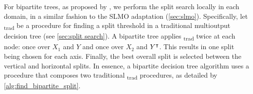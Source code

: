 For bipartite trees, as proposed by , we perform the split search locally in each domain, in a similar fashion to the SLMO adaptation (\autoref{sec:slmo}).
%
%
Specifically, let \FindSplit\textsubscript{trad} be a procedure for finding a split threshold in a traditional multioutput decision tree (see \autoref{sec:split search}).
A bipartite tree applies \FindSplit\textsubscript{trad} twice at each node: once over $X_1$ and $Y$ and once over $X_2$ and $Y^\intercal$. This results in one split being chosen for each axis.
Finally, the best overall split is selected between the vertical and horizontal splits.
In essence, a bipartite decision tree algorithm uses a \FindSplit procedure that composes two traditional \FindSplit\textsubscript{trad} procedures, as detailed by \autoref{alg:find_bipartite_split}.


\algFindBipartiteSplit

